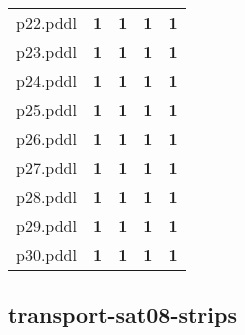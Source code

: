 \documentclass{article}
\begin{document}
\begin{tabular}{@{}lrrrr@{}}
p22.pddl & \textbf{1} & \textbf{1} & \textbf{1} & \textbf{1} \\
p23.pddl & \textbf{1} & \textbf{1} & \textbf{1} & \textbf{1} \\
p24.pddl & \textbf{1} & \textbf{1} & \textbf{1} & \textbf{1} \\
p25.pddl & \textbf{1} & \textbf{1} & \textbf{1} & \textbf{1} \\
p26.pddl & \textbf{1} & \textbf{1} & \textbf{1} & \textbf{1} \\
p27.pddl & \textbf{1} & \textbf{1} & \textbf{1} & \textbf{1} \\
p28.pddl & \textbf{1} & \textbf{1} & \textbf{1} & \textbf{1} \\
p29.pddl & \textbf{1} & \textbf{1} & \textbf{1} & \textbf{1} \\
p30.pddl & \textbf{1} & \textbf{1} & \textbf{1} & \textbf{1} \\
\end{tabular}

\hypertarget{coverage-transport-sat08-strips}{}
\subsection*{transport-sat08-strips}
\end{document}
